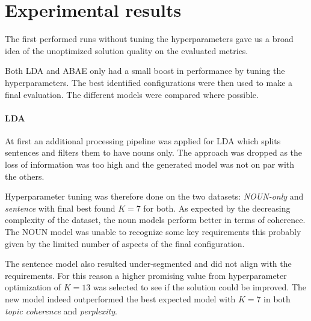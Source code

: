 \section{Experimental results}
The first performed runs without tuning the hyperparameters gave us a broad idea
of the unoptimized solution quality on the evaluated metrics.

Both LDA and ABAE only had a small boost in performance by tuning the hyperparameters.
The best identified configurations were then used to make a final evaluation.
The different models were compared where possible.

\paragraph{LDA}
At first an additional processing pipeline was applied for LDA which splits sentences and filters them to have nouns only.
The approach was dropped as the loss of information was too high and the generated model was not on par with the others.

Hyperparameter tuning was therefore done on the two datasets: \textit{NOUN-only} and \textit{sentence}
with final best found $K=7$ for both.
As expected by the decreasing complexity of the dataset, the noun models perform better in terms of coherence.
The NOUN model was unable to recognize some key requirements this probably given by the limited number of aspects of the final configuration.

The sentence model also resulted under-segmented and did not align with the requirements.
For this reason a higher promising value from hyperparameter optimization of $K=13$ was selected
to see if the solution could be improved.
The new model indeed outperformed the best expected model with $K=7$ in both \textit{topic coherence} and \textit{perplexity}.


